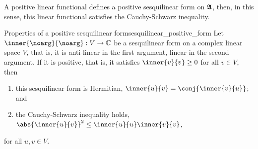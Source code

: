 A positive linear functional defines a positive sesquilinear form on \(\mathfrak{A}\), then, in this sense, this linear functional satisfies the Cauchy-Schwarz inequality.
\begin{proposition}{Properties of a positive sesquilinear form}{sesquilinear_positive_form}
    Let \(\inner{\noarg}{\noarg} : V \to \mathbb{C}\) be a sesquilinear form on a complex linear space \(V\), that is, it is anti-linear in the first argument, linear in the second argument. If it is positive, that is, it satisfies \(\inner{v}{v} \geq 0\) for all \(v \in V\), then
    \begin{enumerate}[label=(\alph*)]
        \item this sesquilinear form is Hermitian, \(\inner{u}{v} = \conj{\inner{v}{u}}\); and
        \item the Cauchy-Schwarz inequality holds, \(\abs{\inner{u}{v}}^2 \leq \inner{u}{u} \inner{v}{v}\),
    \end{enumerate}
    for all \(u,v \in V.\)
\end{proposition}
